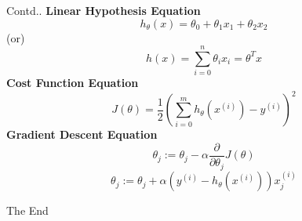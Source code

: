 \documentclass{beamer}
\begin{document}
\begin{frame}{Contd..}
	\textbf{Linear Hypothesis Equation}
	\begin{equation*}
		h_\theta(x) = \theta_0 + \theta_1x_1 + \theta_2x_2
	\end{equation*}
	(or)
	\begin{equation*}
		h(x) = \sum_{i=0}^{n}\theta_ix_i = \theta^Tx
	\end{equation*}
	\textbf{Cost Function Equation}
	\begin{equation*}
		J(\theta) = \frac{1}{2}(\sum_{i=0}^{m}h_\theta(x^{(i)}) - y^{(i)})^2
	\end{equation*}
	\textbf{Gradient Descent Equation}
	\begin{equation*}
		\theta_j := \theta_j - \alpha \frac{\partial}{\partial \theta_j}J(\theta)
	\end{equation*}
	\begin{equation*}
		\theta_j := \theta_j + \alpha (y^{(i)} - h_\theta(x^{(i)}))x_j^{(i)}
	\end{equation*}
\end{frame}
\begin{frame}
\huge{\centerline{The End}}
\end{frame}
\end{document}
